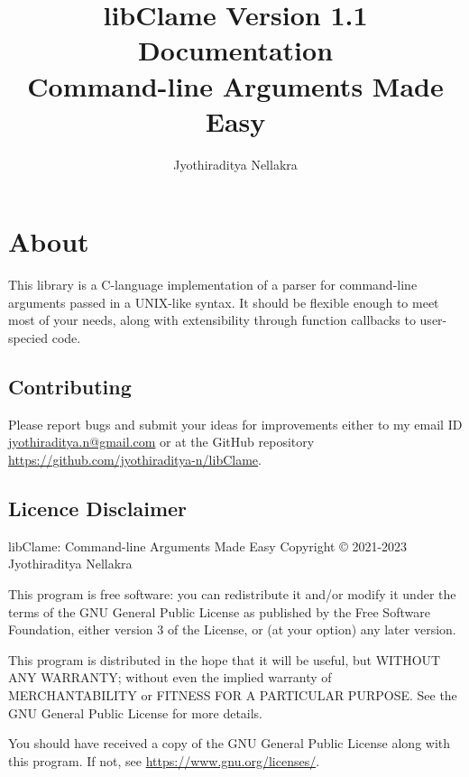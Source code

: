 \documentclass[letterpaper]{article}
\title{libClame Version 1.1 Documentation \\ Command-line Arguments Made Easy}
\author{Jyothiraditya Nellakra}
\begin{document}
\maketitle

\section*{About}

This library is a C-language implementation of a parser for command-line arguments passed in a UNIX-like syntax. It should be flexible enough to meet most of your needs, along with extensibility through function callbacks to user-specied code.

\subsection*{Contributing}

Please report bugs and submit your ideas for improvements either to my email ID \url{jyothiraditya.n@gmail.com} or at the GitHub repository \url{https://github.com/jyothiraditya-n/libClame}. 

\subsection*{Licence Disclaimer}

libClame: Command-line Arguments Made Easy Copyright {\copyright} 2021-2023 Jyothiraditya Nellakra

This program is free software: you can redistribute it and/or modify it under the terms of the GNU General Public License as published by the Free Software Foundation, either version 3 of the License, or (at your option) any later  version.

This program is distributed in the hope that it will be useful, but WITHOUT ANY WARRANTY; without even the implied warranty of MERCHANTABILITY or FITNESS FOR A PARTICULAR PURPOSE. See the GNU General Public License for more details.

You should have received a copy of the GNU General Public License along with this program. If not, see \url{https://www.gnu.org/licenses/}.

\tableofcontents










\end{document}
